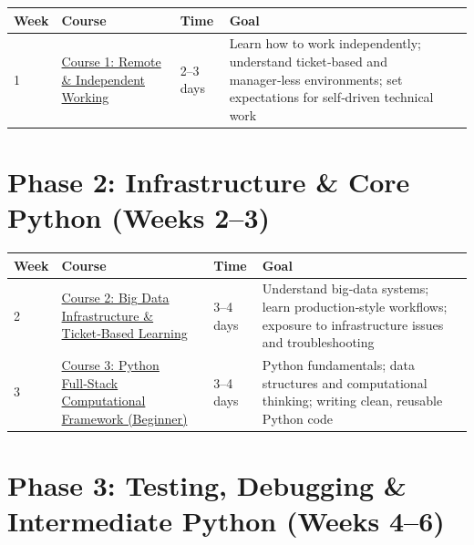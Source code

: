 \documentclass[12pt]{article}
\begin{document}
	\begin{tabularx}{\textwidth}{|X|p{3cm}|p{3cm}|X|}
		\hline
		\textbf{Week} & \textbf{Course} & \textbf{Time} & \textbf{Goal} \\
		\hline
		1 & \href{https://www.udemy.com/course/remote-independent-working-in-a-managerless-environment-101/}{Course 1: Remote \& Independent Working} & 2–3 days & Learn how to work independently; understand ticket‑based and manager‑less environments; set expectations for self‑driven technical work \\
		\hline
	\end{tabularx}
	
	\vspace{0.3cm}
	
	\section*{ Phase 2: Infrastructure \& Core Python (Weeks 2–3)}
	
	\begin{tabularx}{\textwidth}{|X|p{3cm}|p{3cm}|X|}
		\hline
		\textbf{Week} & \textbf{Course} & \textbf{Time} & \textbf{Goal} \\
		\hline
		2 & \href{https://www.udemy.com/course/big-data-infra-admin-101-ticket-based-learning/}{Course 2: Big Data Infrastructure \& Ticket‑Based Learning} & 3–4 days & Understand big‑data systems; learn production‑style workflows; exposure to infrastructure issues and troubleshooting \\
		\hline
		3 & \href{https://www.udemy.com/course/python-full-stack-computational-framework-for-begineers-101/}{Course 3: Python Full‑Stack Computational Framework (Beginner)} & 3–4 days & Python fundamentals; data structures and computational thinking; writing clean, reusable Python code \\
		\hline
	\end{tabularx}
	
	\vspace{0.3cm}
	
	\section*{ Phase 3: Testing, Debugging \& Intermediate Python (Weeks 4–6)}
	
\end{document}
